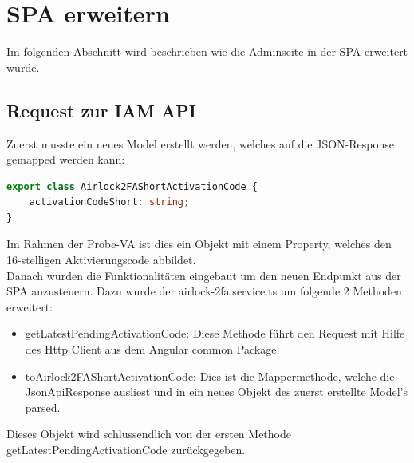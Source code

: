 \section{SPA erweitern}
Im folgenden Abschnitt wird beschrieben wie die Adminseite in der SPA erweitert wurde.

\subsection{Request zur IAM API}
Zuerst musste ein neues Model erstellt werden, welches auf die JSON-Response gemapped werden kann:
\begin{lstlisting}[language=TypeScript]
export class Airlock2FAShortActivationCode {
	activationCodeShort: string;
}
\end{lstlisting}
Im Rahmen der Probe-VA ist dies ein Objekt mit einem Property, welches den 16-stelligen Aktivierungscode abbildet. \\
Danach wurden die Funktionalitäten eingebaut um den neuen Endpunkt aus der SPA anzusteuern. Dazu wurde der \flqq airlock-2fa.service.ts\frqq{} um folgende 2 Methoden erweitert:
\begin{itemize}
	\item getLatestPendingActivationCode: Diese Methode führt den Request mit Hilfe des Http Client aus dem Angular common Package. 
	\item toAirlock2FAShortActivationCode: Dies ist die Mappermethode, welche die JsonApiResponse ausliest und in ein neues Objekt des zuerst erstellte Model's parsed. 
\end{itemize}
Dieses Objekt wird schlussendlich von der ersten Methode \flqq getLatestPendingActivationCode\frqq{} zurückgegeben.

